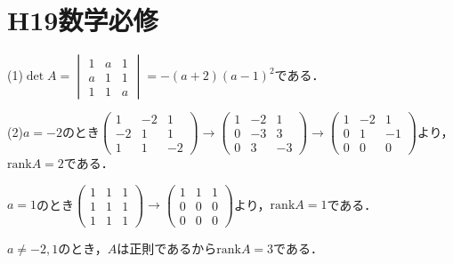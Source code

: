 \documentclass[
		book,
		head_space=20mm,
		foot_space=20mm,
		gutter=10mm,
		line_length=190mm
]{jlreq}
\begin{document}
\section{H19数学必修}
(1)$\det A = \begin{vmatrix}
    1 & a & 1\\
    a & 1 & 1\\
    1 & 1 & a
\end{vmatrix}=-(a+2)(a-1)^2$である．

(2)$a=-2$のとき$\begin{pmatrix}
    1 & -2 & 1\\
    -2 & 1 & 1\\
    1 & 1 & -2
    \end{pmatrix}\rightarrow \begin{pmatrix}
    1 & -2 & 1\\
    0 & -3 & 3\\
    0 & 3 & -3
    \end{pmatrix}\rightarrow \begin{pmatrix}
    1 & -2 & 1\\
    0 & 1 & -1\\
    0 & 0 & 0
    \end{pmatrix}$より，$\mathrm{rank} A=2$である．

$a=1$のとき$\begin{pmatrix}
    1 & 1 & 1\\
    1 & 1 & 1\\
    1 & 1 & 1
    \end{pmatrix}\rightarrow \begin{pmatrix}
    1 & 1 & 1\\
    0 & 0 & 0\\
    0 & 0 & 0
    \end{pmatrix}$より，$\mathrm{rank} A=1$である．

$a\neq -2,1$のとき，$A$は正則であるから$\mathrm{rank} A=3$である．
\end{document}
